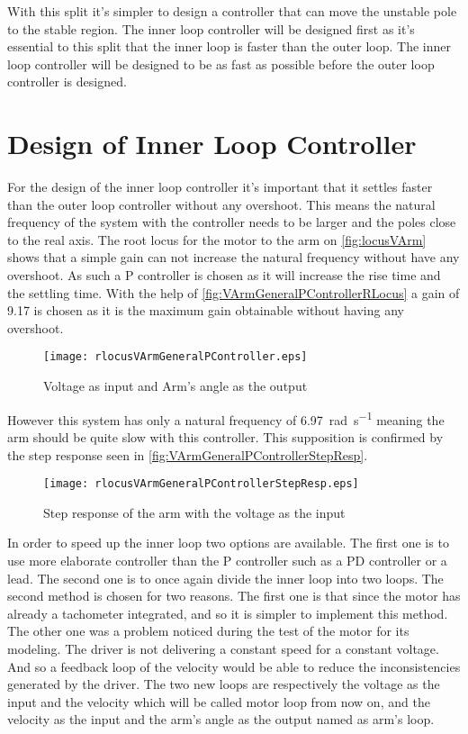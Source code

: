 With this split it's simpler to design a controller that can move the unstable pole to the stable region. The inner loop controller will be designed first as it's essential to this split that the inner loop is faster than the outer loop. The inner loop controller will be designed to be as fast as possible before the outer loop controller is designed.

\section{Design of Inner Loop Controller}

For the design of the inner loop controller it's important that it settles faster than the outer loop controller without any overshoot. This means the natural frequency of the system with the controller needs to be larger and the poles close to the real axis. The root locus for the motor to the arm on \autoref{fig:locusVArm} shows that a simple gain can not increase the natural frequency without have any overshoot. As such a P controller is chosen as it will increase the rise time and the settling time. With the help of \autoref{fig:VArmGeneralPControllerRLocus} a gain of 9.17 is chosen as it is the maximum gain obtainable without having any overshoot.

\begin{figure} [htbp] 
	\centering
	\texttt{[image: rlocusVArmGeneralPController.eps]}
	\caption{Voltage as input and Arm's angle as the output}
	\label{fig:VArmGeneralPControllerRLocus}
\end{figure}

However this system has only a natural frequency of \SI{6.97}{\radian\per\second} meaning the arm should be quite slow with this controller. This supposition is confirmed by the step response seen in \autoref{fig:VArmGeneralPControllerStepResp}.

\begin{figure} [htbp] 
	\centering
	\texttt{[image: rlocusVArmGeneralPControllerStepResp.eps]}
	\caption{Step response of the arm with the voltage as the input}
	\label{fig:VArmGeneralPControllerStepResp}
\end{figure}

In order to speed up the inner loop two options are available. The first one is to use more elaborate controller than the P controller such as a PD controller or a lead. The second one is to once again divide the inner loop into two loops. The second method is chosen for two reasons. The first one is that since the motor has already a tachometer integrated, and so it is simpler to implement this method. The other one was a problem noticed during the test of the motor for its modeling. The driver is not delivering a constant speed for a constant voltage. And so a feedback loop of the velocity would be able to reduce the inconsistencies generated by the driver. The two new loops are respectively the voltage as the input and the velocity which will be called motor loop from now on, and the velocity as the input and the arm's angle as the output named as arm's loop.

